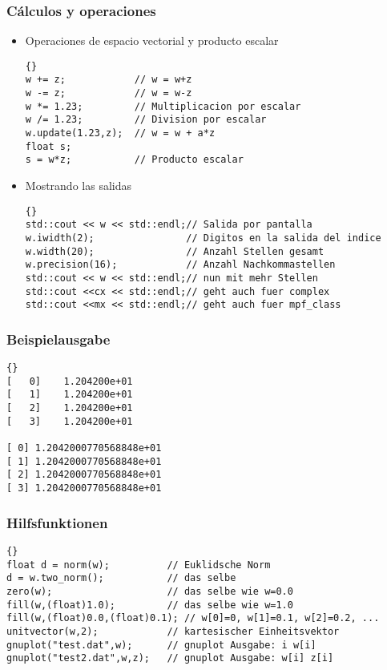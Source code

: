 \documentclass[a4paper,11pt]{article}
\theoremstyle{definition}
\begin{document}
\begin{frame}[fragile]
\frametitle{Cálculos y operaciones}
\begin{itemize}
\item Operaciones de espacio vectorial y producto escalar \\
{\footnotesize{\begin{lstlisting}{}
w += z;            // w = w+z
w -= z;            // w = w-z
w *= 1.23;         // Multiplicacion por escalar
w /= 1.23;         // Division por escalar
w.update(1.23,z);  // w = w + a*z
float s;
s = w*z;           // Producto escalar
\end{lstlisting}}}
\item Mostrando las salidas\\
{\footnotesize{\begin{lstlisting}{}
std::cout << w << std::endl;// Salida por pantalla
w.iwidth(2);                // Digitos en la salida del indice
w.width(20);                // Anzahl Stellen gesamt
w.precision(16);            // Anzahl Nachkommastellen
std::cout << w << std::endl;// nun mit mehr Stellen
std::cout <<cx << std::endl;// geht auch fuer complex
std::cout <<mx << std::endl;// geht auch fuer mpf_class
\end{lstlisting}}}
\end{itemize}
\end{frame}

\begin{frame}[fragile]
\frametitle{Beispielausgabe}
{\footnotesize{\begin{lstlisting}{}
[   0]    1.204200e+01
[   1]    1.204200e+01
[   2]    1.204200e+01
[   3]    1.204200e+01

[ 0] 1.2042000770568848e+01
[ 1] 1.2042000770568848e+01
[ 2] 1.2042000770568848e+01
[ 3] 1.2042000770568848e+01
\end{lstlisting}}}
\end{frame}

\begin{frame}[fragile]
\frametitle{Hilfsfunktionen}
{\footnotesize{\begin{lstlisting}{}
float d = norm(w);          // Euklidsche Norm
d = w.two_norm();           // das selbe
zero(w);                    // das selbe wie w=0.0
fill(w,(float)1.0);         // das selbe wie w=1.0
fill(w,(float)0.0,(float)0.1); // w[0]=0, w[1]=0.1, w[2]=0.2, ...
unitvector(w,2);            // kartesischer Einheitsvektor
gnuplot("test.dat",w);      // gnuplot Ausgabe: i w[i]
gnuplot("test2.dat",w,z);   // gnuplot Ausgabe: w[i] z[i]
\end{lstlisting}}}
\end{frame}
\end{document}

